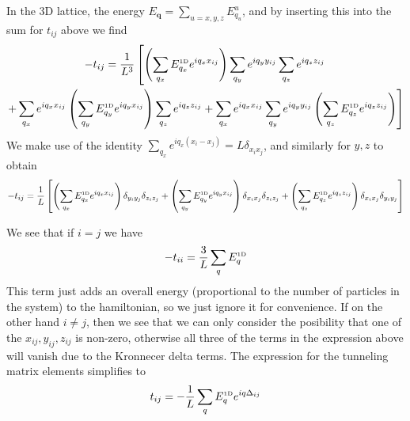 \documentclass[11pt,letter]{article}
\newcommand{\bv}[1]{\ensuremath{\bm{#1}}}
\begin{document}
In the 3D lattice, the energy $E_{\bv{q}} = \sum_{u=x,y,z} E_{q_{u}}^{u} $, and by inserting this into the sum for $t_{ij}$ above we find 
\begin{multline}
-t_{ij} =  \frac{1}{L^{3}} \left[ 
          \left(\sum_{q_{x}} E_{q_{x}}^{\text{\tiny 1D}}   e^{ i q_{x} x_{ij} }   \right)
          \sum_{q_{y}} e^{ i q_{y} y_{ij} }   
          \sum_{q_{z}} e^{ i q_{z} z_{ij} }  
   \right. \\
\left. 
          + 
          \sum_{q_{x}} e^{ i q_{x} x_{ij} }  
          \left(\sum_{q_{y}} E_{q_{y}}^{\text{\tiny 1D}}   e^{ i q_{y} x_{ij} }   \right)
          \sum_{q_{z}} e^{ i q_{z} z_{ij} }  
          + 
          \sum_{q_{x}} e^{ i q_{x} x_{ij} }  
          \sum_{q_{y}} e^{ i q_{y} y_{ij} }   
          \left(\sum_{q_{z}} E_{q_{z}}^{\text{\tiny 1D}}   e^{ i q_{z} z_{ij} }   \right)
\right]
\end{multline}
We make use of the identity $\sum_{q_{x}} e^{ iq_{x}(x_{i}-x_{j}) } = L \delta_{x_{i}x_{j}}$, and similarly for $y,z$ to obtain
\begin{equation}
-t_{ij} =  \frac{1}{L} \left[ 
          \left(\sum_{q_{x}} E_{q_{x}}^{\text{\tiny 1D}}   e^{ i q_{x} x_{ij} }   \right)
          \delta_{y_{i}y_{j}}
          \delta_{z_{i}z_{j}}
          + 
          \left(\sum_{q_{y}} E_{q_{y}}^{\text{\tiny 1D}}   e^{ i q_{y} x_{ij} }   \right)
          \delta_{x_{i}x_{j}}
          \delta_{z_{i}z_{j}}
          + 
          \left(\sum_{q_{z}} E_{q_{z}}^{\text{\tiny 1D}}   e^{ i q_{z} z_{ij} }   \right)
          \delta_{x_{i}x_{j}}
          \delta_{y_{i}y_{j}}
\right]
\end{equation}

We see that if $i=j$ we have 
\begin{equation}
  -t_{ii} =  \frac{3}{L} 
          \sum_{q} E_{q}^{\text{\tiny 1D}}  
\end{equation}
This term just adds an overall energy (proportional to the number of particles
in the system) to the hamiltonian, so we just ignore it for convenience.  If on
the other hand $i\neq j$, then we see that we can only consider the posibility
that one of the $x_{ij}, y_{ij}, z_{ij}$ is non-zero, otherwise all three of
the terms in the expression above will vanish due to the Kronnecer delta terms.
The expression for the tunneling matrix elements simplifies to 
\begin{equation}
  t_{ij} = -\frac{1}{L} \sum_{q} E_{q}^{\text{\tiny 1D}} e^{iq \Delta_{ij}} 
\label{eq:tunneling3D}
\end{equation}
\end{document}
